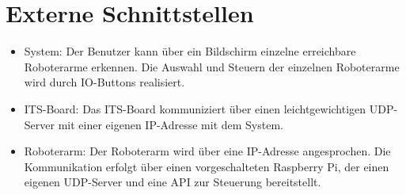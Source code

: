 \begin{itemize}
\end{itemize}


\section{Externe Schnittstellen}

\begin{itemize}
	\item{System:} Der Benutzer kann über ein Bildschirm einzelne erreichbare Roboterarme erkennen. Die Auswahl und Steuern der einzelnen Roboterarme wird durch IO-Buttons realisiert.
	
   	\item{ITS-Board:} Das ITS-Board kommuniziert über einen leichtgewichtigen UDP-Server mit einer eigenen IP-Adresse mit dem System.

	\item{Roboterarm:} Der Roboterarm wird über eine IP-Adresse angesprochen. Die Kommunikation erfolgt über einen vorgeschalteten Raspberry Pi, der einen eigenen UDP-Server und eine API zur Steuerung bereitstellt.


	
\end{itemize}